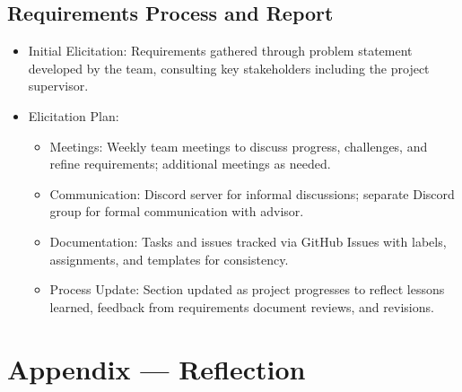 \documentclass{article}
\begin{document}
\subsection{Requirements Process and Report}\label{subsec:reqprocess}
\begin{itemize}
    \item {Initial Elicitation}: Requirements gathered through problem statement developed by the team, consulting key stakeholders including the project supervisor.
    \item {Elicitation Plan}:
    \begin{itemize}
        \item Meetings: Weekly team meetings to discuss progress, challenges, and refine requirements; additional meetings as needed.
        \item Communication: Discord server for informal discussions; separate Discord group for formal communication with advisor.
        \item Documentation: Tasks and issues tracked via GitHub Issues with labels, assignments, and templates for consistency.
        \item Process Update: Section updated as project progresses to reflect lessons learned, feedback from requirements document reviews, and revisions.
    \end{itemize}
\end{itemize}

\newpage{}



\section*{Appendix --- Reflection}

\end{document}
